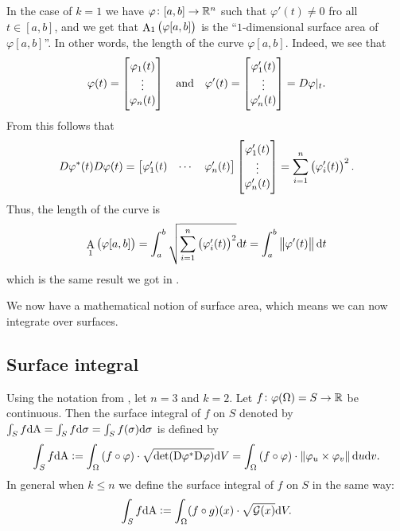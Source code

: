 \documentclass[11pt,a4paper]{article}
\DeclareMathOperator{\A}{A} %
\begin{document}
\begin{example}
  In the case of $k = 1$ we have $\varphi \colon [a,b] \to \mathbb{R}^n$ such
  that $\varphi'(t) \neq 0$ fro all $t \in [a,b]$,
  and we get that $\A_1\del{\varphi[a,b]}$ is the ``$1$-dimensional
  surface area of $\varphi[a,b]$''.
  In other words, the length of the curve $\varphi[a,b]$.
  Indeed, we see that
  \[
    \varphi(t) =
    \begin{bmatrix}
      \varphi_1(t) \\
      \vdots \\
      \varphi_n(t)
    \end{bmatrix}
    \quad \text{and} \quad
    \varphi'(t) =
    \begin{bmatrix}
      \varphi'_1(t) \\
      \vdots \\
      \varphi'_n(t)
    \end{bmatrix} = D \varphi \vert_t.
  \]
  From this follows that
  \[
    D \varphi^*(t) D \varphi(t) =
    \begin{bmatrix}
      \varphi'_1(t) & \cdots & \varphi'_n(t)
    \end{bmatrix}
    \begin{bmatrix}
      \varphi'_1(t) \\
      \vdots \\
      \varphi'_n(t)
    \end{bmatrix} =
    \sum_{i=1}^{n} \del{\varphi'_i(t)}^2.
  \]
  Thus, the length of the curve is
  \[
    \A_1\del{\varphi[a,b]} =
    \int_{a}^{b} \sqrt{\sum_{i=1}^{n} \del{\varphi'_i(t)}^2} \dt =
    \int_{a}^{b} \norm{\varphi'(t)} \dt
  \]
  which is the same result we got in .
\end{example}

\begin{remark}
  We now have a mathematical notion of surface area,
  which means we can now integrate over surfaces.
\end{remark}

\subsection{Surface integral}

\begin{definition}
  \label{def:surface-integral-over-scalar-field}
  Using the notation from ,
  let $n = 3$ and $k = 2$.
  Let $f \colon \varphi(\Omega) = S \to \mathbb{R}$ be continuous.
  Then the surface integral of $f$ on $S$ denoted by
  $\int_{S} f \mathrm{d} \mathrm{A} = \int_{S} f \mathrm{d} \sigma = \int_{S} f(\sigma) \mathrm{d} \sigma$
  is defined by
  \[
    \int_{S} f \dA :=
    \int_{\Omega}
    \del{f \circ \varphi} \cdot \sqrt{\det(\Dif \varphi^* \Dif \varphi)} \dV =
    \int_{\Omega}
    \del{f \circ \varphi} \cdot \norm{\varphi_u \times \varphi_v} \du \dv.
  \]
  In general when $k \le n$ we define the surface integral of $f$ on $S$
  in the same way:
  \[
    \int_{S} f \mathrm{d} \mathrm{A} :=
    \int_{\Omega}
      (f \circ g)(x) \cdot \sqrt{\mathcal G(x)} \mathrm{d} V.
  \]
\end{definition}
\end{document}
